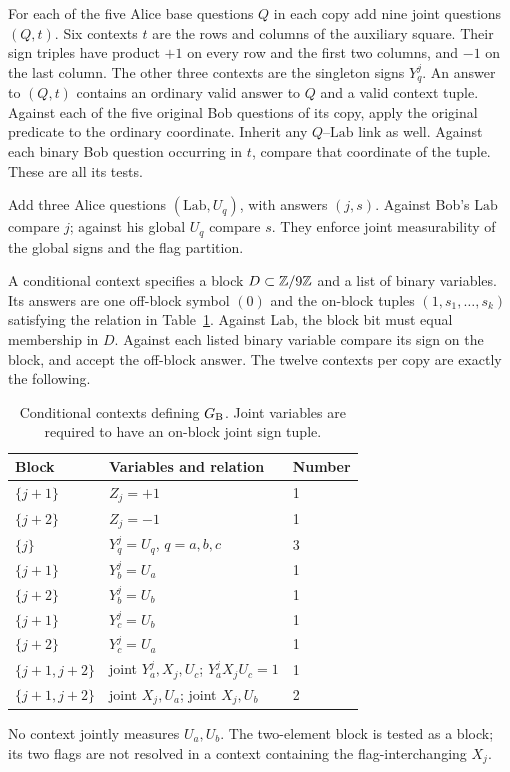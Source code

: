 For each of the five Alice base questions $Q$ in each copy add nine joint questions $(Q,t)$. Six contexts $t$ are the rows and columns of the auxiliary square. Their sign triples have product $+1$ on every row and the first two columns, and $-1$ on the last column. The other three contexts are the singleton signs $Y_q^j$. An answer to $(Q,t)$ contains an ordinary valid answer to $Q$ and a valid context tuple. Against each of the five original Bob questions of its copy, apply the original predicate to the ordinary coordinate. Inherit any $Q$--$\mathrm{Lab}$ link as well. Against each binary Bob question occurring in $t$, compare that coordinate of the tuple. These are all its tests.

Add three Alice questions $(\mathrm{Lab},U_q)$, with answers $(j,s)$. Against Bob's $\mathrm{Lab}$ compare $j$; against his global $U_q$ compare $s$. They enforce joint measurability of the global signs and the flag partition.

A conditional context specifies a block $D\subset\mathbb Z/9\mathbb Z$ and a list of binary variables. Its answers are one off-block symbol $(0)$ and the on-block tuples $(1,s_1,\ldots,s_k)$ satisfying the relation in Table~\ref{tab:contexts}. Against $\mathrm{Lab}$, the block bit must equal membership in $D$. Against each listed binary variable compare its sign on the block, and accept the off-block answer. The twelve contexts per copy are exactly the following.
\begin{table}[ht]
\centering
\begin{tabular}{@{}lll@{}}
\toprule
Block & Variables and relation & Number\\
\midrule
$\{j+1\}$ & $Z_j=+1$ & 1\\
$\{j+2\}$ & $Z_j=-1$ & 1\\
$\{j\}$ & $Y_q^j=U_q$, $q=a,b,c$ & 3\\
$\{j+1\}$ & $Y_b^j=U_a$ & 1\\
$\{j+2\}$ & $Y_b^j=U_b$ & 1\\
$\{j+1\}$ & $Y_c^j=U_b$ & 1\\
$\{j+2\}$ & $Y_c^j=U_a$ & 1\\
$\{j+1,j+2\}$ & joint $Y_a^j,X_j,U_c$; $Y_a^jX_jU_c=1$ & 1\\
$\{j+1,j+2\}$ & joint $X_j,U_a$; joint $X_j,U_b$ & 2\\
\bottomrule
\end{tabular}
\caption{Conditional contexts defining $G_{\mathrm B}$. Joint variables are required to have an on-block joint sign tuple.}\label{tab:contexts}
\end{table}
No context jointly measures $U_a,U_b$. The two-element block is tested as a block; its two flags are not resolved in a context containing the flag-interchanging $X_j$.

